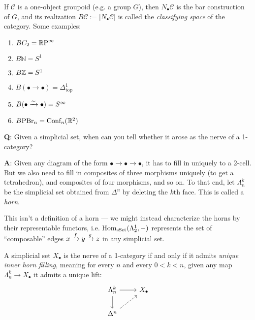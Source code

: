 \documentclass[11pt,openany]{book}
\begin{document}
\begin{example} If $\mathscr{C}$ is a one-object groupoid (e.g. a group $G$), then $N_\bullet \mathscr{C}$ is the bar construction of $G$, and its realization $B \mathscr{C} := |N_\bullet \mathscr{C}|$ is called the \textit{classifying space} of the category. Some examples:
\begin{enumerate}
    \item $BC_2 = {\mathbb{R}\text{P}}^\infty$
    \item $B \mathbb{N} = S^1$
    \item $B\mathbb{Z} = S^1$
    \item $B (\bullet \to \bullet) = \Delta^1_\text{top}$
    \item $B (\bullet \xrightarrow{\sim} \bullet) = S^\infty$
    \item $B\text{PBr}_n = \text{Conf}_n(\mathbb{R}^2)$
\end{enumerate}
\end{example}



\textbf{Q}: Given a simplicial set, when can you tell whether it arose as the nerve of a 1-category?

\textbf{A}: Given any diagram of the form $\bullet \to \bullet \to \bullet$, it has to fill in uniquely to a 2-cell. But we also need to fill in composites of three morphisms uniquely (to get a tetrahedron), and composites of four morphisms, and so on. To that end, let $\Lambda^k_n$ be the simplicial set obtained from $\Delta^n$ by deleting the $k$th face. This is called a \textit{horn}.

This isn't a definition of a horn --- we might instead characterize the horns by their representable functors, i.e. $\mathrm{Hom}_{\mathrm{sSet}}(\Lambda_2^1,-)$ represents the set of ``composable'' edges $x \xrightarrow{f} y \xrightarrow{g} z$ in any simplicial set.

\begin{proposition} A simplicial set $X_\bullet$ is the nerve of a 1-category if and only if it admits \textit{unique inner horn filling}, meaning for every $n$ and every $0 < k < n$, given any map $\Lambda^k_n \to X_\bullet$ it admits a unique lift:
\[ \begin{tikzcd}
    \Lambda^k_n\rar\dar & X_\bullet\\
    \Delta^n\ar[ur,dashed] & 
\end{tikzcd} \]
\end{proposition}
\end{document}
